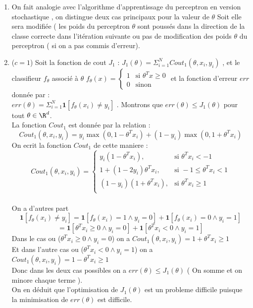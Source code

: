 \documentclass[12pt]{article}
\begin{document}
\begin{enumerate}[1)]
    \item
    On fait analogie avec l'algorithme d'apprentissage du perceptron en version stochastique , on distingue deux cas principaux pour la valeur de $\theta$ Soit elle sera modifiée ( les poids du perceptron $\theta$ sont poussés dans la direction de la classe correcte dans l'itération suivante ou pas de modification des poids $\theta$ du perceptron ( si on a pas commis d'erreur).
    \item ($c=1$) Soit la fonction de cout $J_1$ : $J_1(\theta) = \Sigma_{i=1}^N Cout_1(\theta,x_i,y_i)$ , et le classifieur $f_\theta$ associé à $\theta$ $
     f_\theta(x) =
     \begin{cases}
         1 & \mbox{si } \theta^Tx \geq 0 \\
         0 & \mbox{sinon } 
     \end{cases}
     $ et la fonction d'erreur $err$ donnée par : \\ 
     $err(\theta) = \Sigma_{i=1}^N \textbf{1}[f_\theta(x_i)\neq y_i]$ . Montrons que $err(\theta) \leq J_1(\theta)$ pour tout $\theta \in \R^d$.\\
     La fonction $Cout_1$ est donnée par la relation : 
     \begin{equation}
        Cout_1(\theta,x_i,y_i) = y_i \max(0,1-\theta^Tx_i) + (1-y_i) \max(0,1+\theta^Tx_i)
        \label{eq:e1}
    \end{equation}
     On ecrit la fonction $Cout_1$ de cette maniere :
     $$
     Cout_1(\theta,x_i,y_i) =
     \begin{cases}
         y_i(1-\theta^Tx_i), & \mbox{si } \theta^Tx_i < -1 \\
         1+(1-2y_i)\theta^Tx_i, & \mbox{si } -1 \leq \theta^Tx_i < 1 \\
         (1-y_i)(1+\theta^Tx_i), & \mbox{si }   \theta^Tx_i \geq 1 \\
     \end{cases}
     $$\\
     On a d'autres part
     $$
     \textbf{1}[f_\theta(x_i)\neq y_i] = \textbf{1}[f_\theta(x_i) = 1 \land y_i = 0 ]+ \textbf{1}[f_\theta(x_i) = 0 \land y_i = 1 ]
     $$
     $$
     = \textbf{1}[\theta^Tx_i \geq 0 \land y_i = 0 ]+ \textbf{1}[\theta^Tx_i < 0 \land y_i = 1 ]
     $$
     Dans le cas ou ($\theta^Tx_i \geq 0 \land y_i = 0$) on a $Cout_1(\theta,x_i,y_i) = 1+\theta^Tx_i \geq 1$ \\
     Et dans l'autre cas ou ($\theta^Tx_i < 0 \land y_i = 1$) on a $Cout_1(\theta,x_i,y_i) = 1-\theta^Tx_i \geq 1$ \\
     Donc dans les deux cas possibles on a $err(\theta) \leq J_1(\theta)$ ( On somme et on minore chaque terme ).\\
     On en déduit que l'optimisation de $J_1(\theta)$ est un probleme difficile puisque la minimisation de $err(\theta)$ est difficile.
\end{enumerate}
\end{document}
